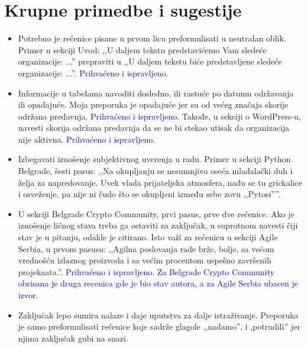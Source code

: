 \documentclass[a4paper]{report}
\newcommand{\odgovor}[1]{\textcolor{blue}{#1}}
\begin{document}
\section{Krupne primedbe i sugestije}
\begin{itemize}
    \item Potrebno je rečenice pisane u prvom licu  preformulisati u neutralan oblik. 
    Primer u sekciji Uvod: ,,U daljem tekstu predstavićemo Vam sledeće organizacije: ...'' prepraviti u ,,U daljem tekstu biće predstavljene sledeće organizacije: ...''.
    \odgovor{Prihvaćeno i ispravljeno.}
    \item Informacije u tabelama navoditi dosledno, ili rastuće po datumu održavanja ili opadajuće. Moja preporuka je opadajuće jer su od većeg značaja skorije održana predavnja. 
    \odgovor{Prihvaćeno i ispravljeno.}
    Takođe, u sekciji o WordPress-u, navesti skorija održana predavnja da se ne bi stekao utisak da organizacija nije aktivna. \odgovor{Prihvaćeno i ispravljeno.}
    \item Izbegavati iznošenje subjektivnog uverenja u radu.
    Primer u sekciji Python Belgrade, šesti pasus: ,,Na okupljanju se nesumnjivo oseća mladalački duh i želja za napredovanje. Uvek vlada prijateljska atmosfera, nađu se tu grickalice i osveženje, pa nije ni čudo što se okupljeni između sebe zovu ,,Pytosi''''.
    \odgovor{} %
    \item U sekciji Belgrade Crypto Community, prvi pasus, prve dve rečenice. Ako je iznošenje ličnog stava treba ga ostaviti za zaključak, u suprotnom navesti čiji stav je u pitanju, odakle je citirano. Isto važi za rečenicu u sekciji Agile Serbia, u prvom pasusu: ,,Agilna poslovanja rade brže, bolje, sa većom vrednošću izlaznog proizvoda i sa većim procentom uspešno završenih projekaata.''. 
    \odgovor{Prihvaćeno i ispravljeno. Za Belgrade Crypto Community obrisana je druga recenica gde je bio stav autora, a za Agile Serbia ubacen je izvor.}
    \item Zaključak lepo sumira nalaze i daje uputstva za dalje istraživanje. Preporuka je samo preformulisati rečenice koje sadrže glagole ,,nadamo'', i ,potrudili'' jer njima zaključak gubi na snazi.
    \odgovor{} %
    
\end{itemize}{}
\end{document}
